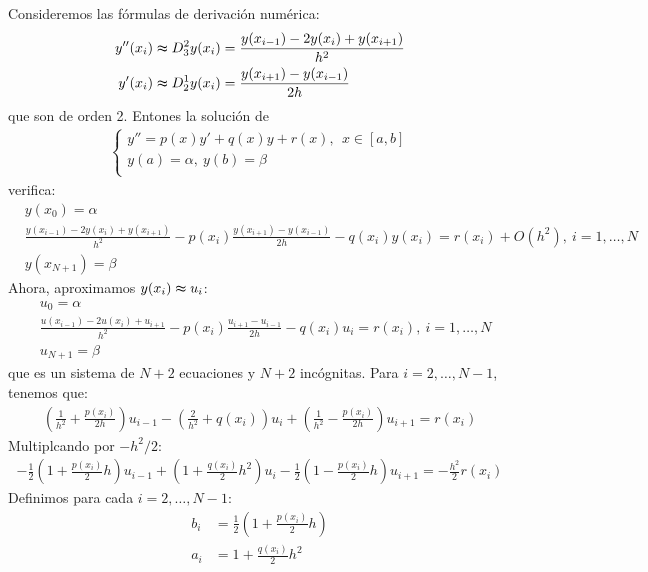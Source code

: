 \begin{ejemplo}
Consideremos las fórmulas de derivación numérica:
\begin{align*}
    y''(x_i) &\thickapprox D_3^2y(x_i) = \frac{y(x_{i-1}) - 2y(x_i) + y(x_{i+1})}{h^2} \\
    y'(x_i) &\thickapprox D_2^1y(x_i) = \frac{y(x_{i+1}) - y(x_{i-1})}{2h}
\end{align*}
que son de orden 2. Entones la solución de 
\begin{align*}
    \left\{ \begin{array}{lcc}
             y'' = p(x)y' + q(x)y + r(x), \ \ x \in [a,b]\\
             y(a) = \alpha, \ y(b) = \beta \\
             \end{array}
   \right.
\end{align*}
verifica:
\begin{align*}
    &y(x_0) = \alpha \\
    &\frac{y(x_{i-1}) - 2y(x_i) + y(x_{i+1})}{h^2} - p(x_i)\frac{y(x_{i+1}) - y(x_{i-1})}{2h} -q(x_i)y(x_i) = r(x_i) + O(h^2), \ i = 1,\ldots,N \\
    &y(x_{N+1}) = \beta
\end{align*}
Ahora, aproximamos $y(x_i) \thickapprox u_i$:
\begin{align*}
    &u_0 = \alpha \\
    &\frac{u(x_{i-1}) - 2u(x_i) +u_{i+1}}{h^2} - p(x_i)\frac{u_{i+1} - u_{i-1}}{2h} -q(x_i)u_i = r(x_i) , \ i = 1,\ldots,N \\
    &u_{N+1} = \beta
\end{align*}
que es un sistema de $N+2$ ecuaciones y $N+2$ incógnitas. Para $i = 2,\ldots,N-1$, tenemos que:
\begin{align*}
    \left( \frac{1}{h^2} + \frac{p(x_i)}{2h} \right) u_{i-1} - \left( \frac{2}{h^2} + q(x_i)\right)u_i + \left( \frac{1}{h^2} - \frac{p(x_i)}{2h} \right)u_{i+1} = r(x_i)
\end{align*}
Multiplcando por $-h^2/2$:
\begin{align*}
    -\frac{1}{2}\left(1 + \frac{p(x_i)}{2}h \right)u_{i-1} + \left(1 + \frac{q(x_i)}{2}h^2 \right)u_{i} - \frac{1}{2}\left(1 - \frac{p(x_i)}{2}h \right)u_{i+1} = -\frac{h^2}{2}r(x_i)
\end{align*}
Definimos para cada $i = 2,\ldots,N-1$:
\begin{align*}
    b_i &= \frac{1}{2}\left(1 + \frac{p(x_i)}{2}h \right) \\
    a_i &= 1 + \frac{q(x_i)}{2}h^2  \\

\end{align*}
\end{ejemplo}
